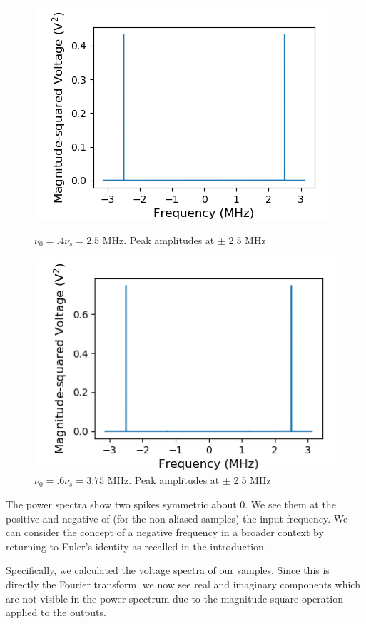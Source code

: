 \documentclass[a4paper]{article}
\begin{document}
\begin{figure}
\centering
\begin{minipage}{.5\textwidth}
	\centering
	\includegraphics[width=.8\linewidth]{5-2/pow4}
	\caption{$\nu_0 = .4 \nu_s = 2.5$ MHz. \hfill \break Peak amplitudes at $\pm$ 2.5 MHz}
	\label{fig:NyPw4}
\end{minipage}%
\begin{minipage}{.5\textwidth}
	\centering
	\includegraphics[width=.8\linewidth]{5-2/pow6}
	\caption{$\nu_0 = .6 \nu_s = 3.75$ MHz. \hfill \break Peak amplitudes at $\pm$ 2.5 MHz}
	\label{fig:NyPw6}
\end{minipage}
\end{figure}


The power spectra show two spikes symmetric about 0. We see them at the positive and negative of (for the non-aliased samples) the input frequency. We can consider the concept of a negative frequency in a broader context by returning to Euler's identity as recalled in the introduction.

Specifically, we calculated the voltage spectra of our samples. Since this is directly the Fourier transform, we now see real and imaginary components which are not visible in the power spectrum due to the magnitude-square operation applied to the outputs.
\end{document}
